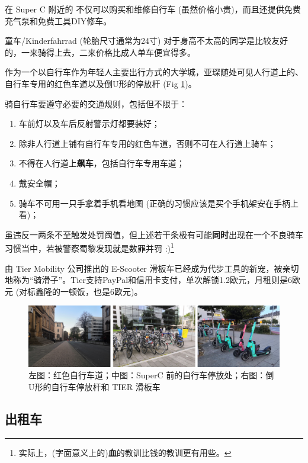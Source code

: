     在 Super C 附近的  不仅可以购买和维修自行车 (虽然价格小贵)，而且还提供免费充气泵和免费工具DIY修车。

    童车/Kinderfahrrad (轮胎尺寸通常为24寸) 对于身高不太高的同学是比较友好的，一来骑得上去，二来价格比成人单车便宜得多。

    作为一个以自行车作为年轻人主要出行方式的大学城，亚琛随处可见人行道上的、自行车专用的红色车道以及倒U形的停放杆 (Fig \ref{fig:自行车})。

    骑自行车要遵守必要的交通规则，包括但不限于：

    \begin{enumerate}
      \item 车前灯以及车后反射警示灯都要装好；
      \item 除非人行道上铺有自行车专用的红色车道，否则不可在人行道上骑车；
      \item 不得在人行道上\textbf{飙车}，包括自行车专用车道；
      \item 戴安全帽；
      \item 骑车不可用一只手拿着手机看地图 (正确的习惯应该是买个手机架安在手柄上看)；
    \end{enumerate}
    虽违反一两条不至触发处罚阈值，但上述若干条极有可能\textbf{同时}出现在一个不良骑车习惯当中，若被警察蜀黎发现就是数罪并罚 :)\footnote{实际上，(字面意义上的)\textbf{血}的教训比钱的教训更有用些。}

    由 Tier Mobility 公司推出的 E-Scooter 滑板车已经成为代步工具的新宠，被亲切地称为``骑滑子''。Tier支持PayPal和信用卡支付，单次解锁1.2欧元，月租则是6欧元 (对标鑫隆的一顿饭，也是6欧元)。

    \begin{figure}
      \centering
      \includegraphics[width=\textwidth]{在亚琛学习和生活/Verkersmittel/自行车.png}
      \caption{左图：红色自行车道；中图：SuperC 前的自行车停放处；右图：倒U形的自行车停放杆和 TIER 滑板车}
      \label{fig:自行车}
    \end{figure}

  \subsection{出租车}\label{subsec:出租车}

